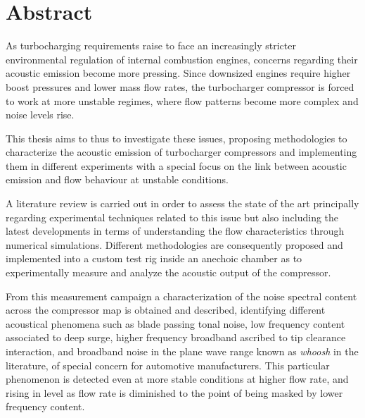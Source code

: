 

\titleformat{\chapter}[hang]{}{}{0mm}{\large\bfseries\sffamily\Huge}
\chapter*{Abstract}

\noindent As turbocharging requirements raise to face an increasingly stricter environmental regulation of internal combustion engines, concerns regarding their acoustic emission become more pressing. Since downsized engines require higher boost pressures and lower mass flow rates, the turbocharger compressor is forced to work at more unstable regimes, where flow patterns become more complex and noise levels rise. 

This thesis aims to thus to investigate these issues, proposing methodologies to characterize the acoustic emission of turbocharger compressors and implementing them in different experiments with a special focus on the link between acoustic emission and flow behaviour at unstable conditions.

A literature review is carried out in order to assess the state of the art principally regarding experimental techniques related to this issue but also including the latest developments in terms of understanding the flow characteristics through numerical simulations. Different methodologies are consequently proposed and implemented into a custom test rig inside an anechoic chamber as to experimentally measure and analyze the acoustic output of the compressor.

From this measurement campaign a characterization of the noise spectral content across the compressor map is obtained and described, identifying different acoustical phenomena such as blade passing tonal noise, low frequency content associated to deep surge, higher frequency broadband ascribed to tip clearance interaction, and broadband noise in the plane wave range known as \emph{whoosh} in the literature, of special concern for automotive manufacturers. This particular phenomenon is detected even at more stable conditions at higher flow rate, and rising in level as flow rate is diminished to the point of being masked by lower frequency content.

